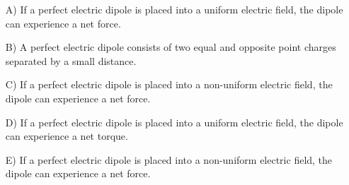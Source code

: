 \documentclass[11pt]{article}
\begin{document}
\begin{itemize}
	\item[A)] If a perfect electric dipole is placed into a uniform electric field, the dipole can experience a net force.
	\item[B)] A perfect electric dipole consists of two equal and opposite point charges separated by a small distance.
	\item[C)] If a perfect electric dipole is placed into a non-uniform electric field, the dipole can experience a net force.
	\item[D)] If a perfect electric dipole is placed into a uniform electric field, the dipole can experience a net torque.
	\item[E)] If a perfect electric dipole is placed into a non-uniform electric field, the dipole can experience a net force.
\end{itemize}


\pagebreak
\end{document}
